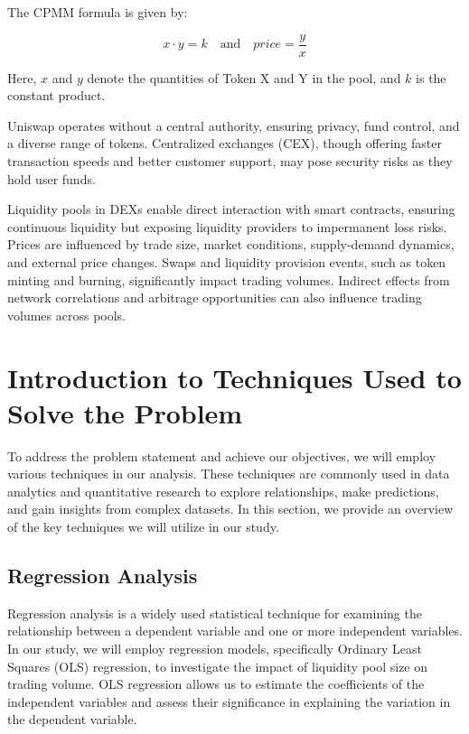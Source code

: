 \documentclass{article}
\begin{document}
{The CPMM formula is given by:

\[x \cdot y = k \quad \text{and} \quad price = \frac{y}{x}\]

Here, \(x\) and \(y\) denote the quantities of Token X and Y in the pool, and \(k\) is the constant product.

Uniswap operates without a central authority, ensuring privacy, fund control, and a diverse range of tokens. Centralized exchanges (CEX), though offering faster transaction speeds and better customer support, may pose security risks as they hold user funds.

Liquidity pools in DEXs enable direct interaction with smart contracts, ensuring continuous liquidity but exposing liquidity providers to impermanent loss risks. Prices are influenced by trade size, market conditions, supply-demand dynamics, and external price changes. Swaps and liquidity provision events, such as token minting and burning, significantly impact trading volumes. Indirect effects from network correlations and arbitrage opportunities can also influence trading volumes across pools.

\section*{\textbf{Introduction to Techniques Used to Solve the Problem}}

To address the problem statement and achieve our objectives, we will employ various techniques in our analysis. These techniques are commonly used in data analytics and quantitative research to explore relationships, make predictions, and gain insights from complex datasets. In this section, we provide an overview of the key techniques we will utilize in our study.

\subsection*{Regression Analysis}

Regression analysis is a widely used statistical technique for examining the relationship between a dependent variable and one or more independent variables. In our study, we will employ regression models, specifically Ordinary Least Squares (OLS) regression, to investigate the impact of liquidity pool size on trading volume. OLS regression allows us to estimate the coefficients of the independent variables and assess their significance in explaining the variation in the dependent variable.

}
\end{document}
